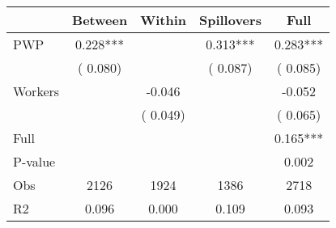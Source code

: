 
\begin{tabular}{l*{4}{c}}\hline&\multicolumn{1}{c}{Between}&\multicolumn{1}{c}{Within}&\multicolumn{1}{c}{Spillovers}&\multicolumn{1}{c}{Full}\\ \hline
 PWP           &              0.228***      &                                               &        0.313*** &         0.283***                            \\ 
                               &        (       0.080)           &                                       &       (       0.087)     &      (       0.085)                                           \\ 
 Workers       &                                               &       -0.046    &                                &            -0.052                            \\ 
                               &                                               & (       0.049)                  &                                        &      (       0.065)                                           \\ 
\hline                                                                                                                                                                                                                                            
 Full                  &                                               &                                               &                                        &             0.165***                                     \\ 
 P-value               &                                               &                                               &                                        &             0.002                                           \\ 
 Obs                   &               2126               &       1924                       &       1386                &              2718                                               \\ 
 R2                    &                      0.096              &              0.000                      &              0.109               &                     0.093                                              \\ 
\hline \end{tabular}                                                                                                                                                                                                              